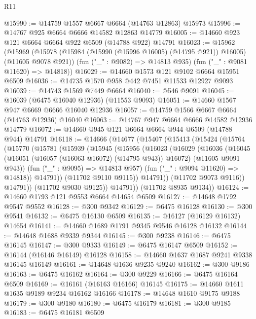 \begin{lexlean}{R11}
\begin{coremodule}
@15990 := @14759 @1557 @6667 @6664 (@14763 @12863) @15973
@15996 := @14767 @925 @6664 @6666 @14582 @12863 @14779
@16005 := @14660 @923 @121 @6664 @6664 @922 @6509 (@14788 @922) @14791
@16023 := @15962
    (@15969
      (@15978 (@15984 (@15990 (@15996 @16005) (@14795 @921)) @16005) (@11605 @9078 @921))
      (fun ("_" : @9082) => @14813 @935)
      (fun ("_" : @9081 @11620) => @14818))
@16029 := @14660 @1573 @121 @9102 @6664 @15951 @6509
@16036 := @14735 @1570 @958 @442 @7451 @11533 @12927 @9093
@16039 := @14743 @1569 @7449 @6664
@16040 := @546 @9091
@16045 := @16039 (@6475 @16040 @12936) (@11553 @9093)
@16051 := @14660 @1567 @947 @6669 @6666 @16040 @12936
@16057 := @14759 @1566 @6667 @6664 (@14763 @12936) @16040
@16063 := @14767 @947 @6664 @6666 @14582 @12936 @14779
@16072 := @14660 @945 @121 @6664 @6664 @944 @6509 (@14788 @944) @14791
@16118 := @14666
    (@14677
      (@15407
        (@15413
          (@15424
            (@15764
              (@15770
                (@15781
                  (@15939
                    (@15945
                      (@15956
                        (@16023
                          (@16029
                            (@16036
                              (@16045
                                (@16051 (@16057 (@16063 @16072) (@14795 @943)) @16072)
                                (@11605 @9091 @943))
                              (fun ("_" : @9095) => @14813 @957)
                              (fun ("_" : @9094 @11620) => @14818))
                            @14791))
                        (@11702 @9110 @9115))
                      @14791))
                  (@11702 @9073 @9116))
                @14791))
            (@11702 @9030 @9125))
          @14791))
      (@11702 @8935 @9134))
@16124 := @14660 @1793 @121 @9553 @6664 @14654 @6509
@16127 := @14648 @1792 @9547 @9552
@16128 := @300 @9342
@16129 := @6475 @16128
@16130 := @300 @9541
@16132 := @6475 @16130 @6509
@16135 := @16127 (@16129 @16132) @14654
@16141 := @14660 @1689 @1791 @9345 @9546 @16128 @16132
@16144 := @14648 @1688 @9339 @9344
@16145 := @300 @9238
@16146 := @6475 @16145
@16147 := @300 @9333
@16149 := @6475 @16147 @6509
@16152 := @16144 (@16146 @16149) @16128
@16158 := @14660 @1637 @1687 @9241 @9338 @16145 @16149
@16161 := @14648 @1636 @9235 @9240
@16162 := @300 @9186
@16163 := @6475 @16162
@16164 := @300 @9229
@16166 := @6475 @16164 @6509
@16169 := @16161 (@16163 @16166) @16145
@16175 := @14660 @1611 @1635 @9189 @9234 @16162 @16166
@16178 := @14648 @1610 @9175 @9188
@16179 := @300 @9180
@16180 := @6475 @16179
@16181 := @300 @9185
@16183 := @6475 @16181 @6509

\end{coremodule}
\end{lexlean}
